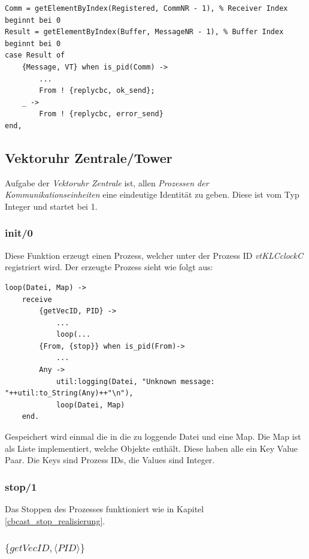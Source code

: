 \begin{lstlisting}[caption={Codeausschnitt multicastM},captionpos=b, label={towercbc_m_realisierung_code}]
Comm = getElementByIndex(Registered, CommNR - 1), % Receiver Index beginnt bei 0
Result = getElementByIndex(Buffer, MessageNR - 1), % Buffer Index beginnt bei 0
case Result of
    {Message, VT} when is_pid(Comm) -> 
        ...
        From ! {replycbc, ok_send};
    _ -> 
        From ! {replycbc, error_send}
end,
\end{lstlisting}

\subsection{Vektoruhr Zentrale/Tower}

Aufgabe der \textit{Vektoruhr Zentrale} ist, allen \textit{Prozessen der Kommunikationseinheiten} eine eindeutige Identität zu geben. Diese ist vom Typ Integer und startet bei 1.

\subsubsection{init/0}

Diese Funktion erzeugt einen Prozess, welcher unter der Prozess ID \textit{vtKLCclockC} registriert wird. Der erzeugte Prozess sieht wie folgt aus:

\begin{lstlisting}
loop(Datei, Map) ->
    receive
        {getVecID, PID} ->
            ...
            loop(...
        {From, {stop}} when is_pid(From)->
            ...
        Any -> 
            util:logging(Datei, "Unknown message: "++util:to_String(Any)++"\n"),
            loop(Datei, Map)
    end.
\end{lstlisting}

Gespeichert wird einmal die in die zu loggende Datei und eine Map. Die Map ist als Liste implementiert, welche Objekte enthält. Diese haben alle ein Key Value Paar. Die Keys sind Prozess IDs, die Values sind Integer.

\subsubsection{stop/1}

Das Stoppen des Prozesses funktioniert wie in Kapitel \ref{cbcast_stop_realisierung}.

\subsubsection{$\{getVecID,\langle PID\rangle\}$}

